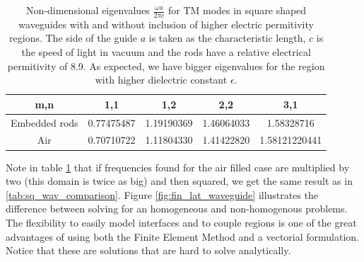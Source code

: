 
\begin{table}

\begin{center}
\begin{tabular}{|c|c|c|c|c|}
\hline 
m,n & 1,1 & 1,2 & 2,2 & 3,1 \\ 
\hline 
Embedded rods & 0.77475487 & 1.19190369 & 1.46064033 & 1.58328716 \\ 
\hline 
Air  & 0.70710722 &  1.11804330  &  1.41422820 & 1.58121220441 \\
\hline 
\end{tabular}
\caption{Non-dimensional eigenvalues $\frac{\omega a}{2\pi c}$ for TM modes in  square shaped waveguides with and without inclusion of higher electric permitivity regions. The side of the guide $a$ is taken as the characteristic length, $c$ is the speed of light in vacuum and the rods have a relative electrical permitivity of 8.9. As expected, we have bigger eigenvalues for the region with higher dielectric constant $\epsilon$.}
\label{tab:fin_lat_comparison}
\end{center}
\end{table}

Note in table \ref{tab:fin_lat_comparison} that if frequencies found for the air filled case are multiplied by two (this domain is twice as big) and then squared, we get the same result as in   \ref{tab:sq_wav_comparison}. 
Figure \ref{fig:fin_lat_waveguide} illustrates the difference between solving for an homogeneous and non-homogenous problems. The flexibility to easily model interfaces and to couple regions is one of the great advantages of using both the Finite Element Method and a vectorial formulation. Notice that these are solutions that are hard to solve analytically.

